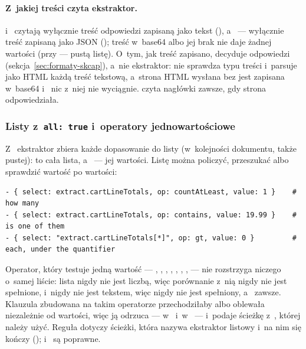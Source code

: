 \paragraph{Z~jakiej treści czyta ekstraktor.}  i~ czytają
wyłącznie treść odpowiedzi zapisaną jako tekst (), a~
--- wyłącznie treść zapisaną jako JSON (); treść w~base64 albo jej brak
nie daje żadnej wartości (przy  --- pustą listę). O~tym, jak treść
zapisano, decyduje  odpowiedzi (sekcja~\ref{sec:formaty-skcap}), a~nie
ekstraktor:  nie sprawdza typu treści i~parsuje jako HTML każdą treść tekstową,
a~strona HTML wysłana bez  jest zapisana w~base64 i~ nic
z~niej nie wyciągnie.  czyta nagłówki zawsze, gdy strona odpowiedziała.

\subsubsection{Listy z~\texttt{all: true} i~operatory jednowartościowe}

Z~ ekstraktor zbiera każde dopasowanie do listy (w~kolejności dokumentu,
także pustej):  to cała lista, a~ --- jej wartości. Listę można policzyć, przeszukać albo
sprawdzić wartość po wartości:

\begin{lstlisting}
- { select: extract.cartLineTotals, op: countAtLeast, value: 1 }    # how many
- { select: extract.cartLineTotals, op: contains, value: 19.99 }    # is one of them
- { select: "extract.cartLineTotals[*]", op: gt, value: 0 }         # each, under the quantifier
\end{lstlisting}

Operator, który testuje jedną wartość --- , , ,
, , , ,
 --- nie rozstrzyga niczego o~samej liście: lista nigdy nie jest liczbą,
więc porównanie z~nią nigdy nie jest spełnione, i~nigdy nie jest tekstem, więc
 nigdy nie jest spełniony, a~ zawsze. Klauzula zbudowana
na takim operatorze przechodziłaby albo oblewała niezależnie od wartości, więc
 ją odrzuca --- w~ i~w~ --- i~podaje
ścieżkę z~\repopath{[*]}, której należy użyć. Reguła dotyczy ścieżki, która nazywa ekstraktor
listowy i~na nim się kończy ();  i~ są poprawne.

